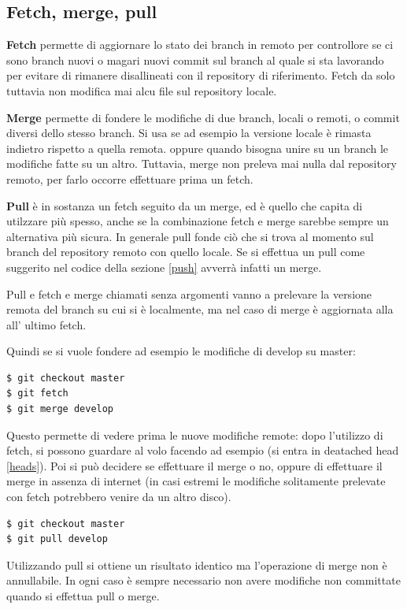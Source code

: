 \documentclass{article}
\begin{document}
\subsection{Fetch, merge, pull\label{merge}}
\textbf{Fetch} permette di aggiornare lo stato dei branch in remoto per
controllore se ci sono branch nuovi o magari nuovi commit sul branch al quale si
sta lavorando per evitare di rimanere disallineati con il repository di riferimento.
Fetch da solo tuttavia non modifica mai alcu file sul repository locale.

\textbf{Merge} permette di fondere le modifiche di due branch, locali o remoti,
o commit diversi dello stesso branch.
Si usa se ad esempio la versione locale è rimasta indietro rispetto a quella remota.
oppure quando bisogna unire su un branch le modifiche fatte su un altro.
Tuttavia, merge non preleva mai nulla dal repository remoto, per farlo occorre
effettuare prima un fetch.

\textbf{Pull} è in sostanza un fetch seguito da un merge, ed è quello che capita
di utilzzare più spesso, anche se la combinazione fetch e merge sarebbe sempre
un alternativa più sicura.
In generale pull fonde ciò che si trova al momento sul branch del repository
remoto con quello locale.
Se si effettua un pull come suggerito nel codice della sezione \ref{push}
avverrà infatti un merge.

Pull e fetch e merge chiamati senza argomenti vanno a prelevare la versione
remota del branch su cui si è localmente, ma nel caso di merge è aggiornata alla
all' ultimo fetch.

Quindi se si vuole fondere ad esempio le modifiche di develop su master:

\begin{verbatim}
$ git checkout master
$ git fetch
$ git merge develop
\end{verbatim}

Questo permette di vedere prima le nuove modifiche remote: dopo l'utilizzo di
fetch, si possono guardare al volo facendo ad esempio
 (si entra in deatached head \ref{heads}).
Poi si può decidere se effettuare il merge o no, oppure di effettuare il merge
in assenza di internet (in casi estremi le modifiche solitamente prelevate con
fetch potrebbero venire da un altro disco).

\begin{verbatim}
$ git checkout master
$ git pull develop
\end{verbatim}

Utilizzando pull si ottiene un risultato identico ma l'operazione di merge non è
annullabile.
In ogni caso è sempre necessario non avere modifiche non committate quando si
effettua pull o merge.
\end{document}
